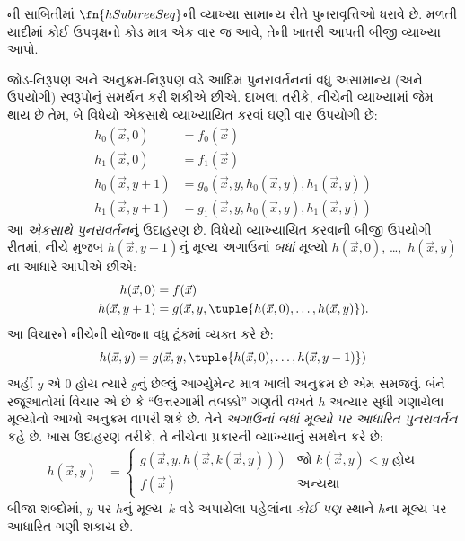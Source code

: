 \begin{prob}
  ની સાબિતીમાં
  $\fn{hSubtreeSeq}$ની વ્યાખ્યા સામાન્ય રીતે પુનરાવૃત્તિઓ
  ધરાવે છે. મળતી યાદીમાં કોઈ ઉપવૃક્ષનો કોડ માત્ર એક વાર જ આવે,
  તેની ખાતરી આપતી બીજી વ્યાખ્યા આપો.
\end{prob}
\endgroup


\begingroup
\makeatletter{}\makeatother

\label{guunit:OLP-0222}


જોડ-નિરૂપણ અને અનુક્રમ-નિરૂપણ વડે આદિમ પુનરાવર્તનનાં વધુ અસામાન્ય
(અને ઉપયોગી) સ્વરૂપોનું સમર્થન કરી શકીએ છીએ. દાખલા તરીકે, નીચેની
વ્યાખ્યામાં જેમ થાય છે તેમ, બે વિધેયો એકસાથે વ્યાખ્યાયિત કરવાં ઘણી
વાર ઉપયોગી છે:
\begin{align*}
h_0(\vec x, 0) & = f_0(\vec x) \\
h_1(\vec x, 0) & = f_1(\vec x) \\
h_0(\vec x, y+1) & = g_0(\vec x, y, h_0(\vec x, y), h_1(\vec x, y)) \\
h_1(\vec x, y+1) & = g_1(\vec x, y, h_0(\vec x, y), h_1(\vec x, y))
\end{align*}
આ \emph{એકસાથે પુનરાવર્તન}નું ઉદાહરણ છે. વિધેયો વ્યાખ્યાયિત
કરવાની બીજી ઉપયોગી રીતમાં, નીચે મુજબ $h(\vec x, y+1)$નું મૂલ્ય
અગાઉનાં \emph{બધાં} મૂલ્યો $h(\vec x, 0)$, \dots,~$h(\vec x, y)$ના
આધારે આપીએ છીએ:
\begin{align*}
h(\vec x, 0) & = f(\vec x) \\
h(\vec x, y+1) & = g(\vec x, y, \tuple{h(\vec x, 0), \dots, h(\vec x, y)}).
\end{align*}
આ વિચારને નીચેની યોજના વધુ ટૂંકમાં વ્યક્ત કરે છે:
\[
h(\vec x, y) = g(\vec x, y, \tuple{h(\vec x, 0), \dots, h(\vec x, y-1)})
\]
અહીં $y$ એ $0$ હોય ત્યારે $g$નું છેલ્લું આર્ગ્યુમેન્ટ માત્ર ખાલી
અનુક્રમ છે એમ સમજવું. બંને રજૂઆતોમાં વિચાર એ છે કે ``ઉત્તરગામી
તબક્કો'' ગણતી વખતે $h$ અત્યાર સુધી ગણાયેલા મૂલ્યોનો આખો અનુક્રમ
વાપરી શકે છે. તેને \emph{અગાઉનાં બધાં મૂલ્યો પર આધારિત પુનરાવર્તન}
કહે છે. ખાસ ઉદાહરણ તરીકે, તે નીચેના પ્રકારની વ્યાખ્યાનું સમર્થન કરે
છે:
\begin{align*}
h(\vec x, y) & = \begin{cases}
  g(\vec x, y, h(\vec x, k(\vec x, y))) & \text{જો $k(\vec x, y) < y$ હોય} \\
  f(\vec x) & \text{અન્યથા}
\end{cases}
\end{align*}
બીજા શબ્દોમાં, $y$ પર $h$નું મૂલ્ય~$k$ વડે અપાયેલા પહેલાંના
\emph{કોઈ પણ} સ્થાને $h$ના મૂલ્ય પર આધારિત ગણી શકાય છે.


